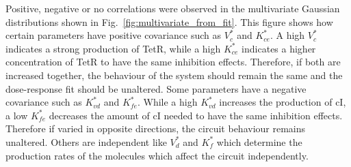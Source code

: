 Positive, negative or no correlations were observed in the multivariate Gaussian distributions shown in Fig.~\ref{fig:multivariate_from_fit}.
This figure shows how certain parameters have positive covariance such as $V^*_c$ and $K^*_{ce}$.
A high $V^*_c$ indicates a strong production of TetR, while a high $K^*_{ce}$ indicates a higher concentration of TetR to have the same inhibition effects.
Therefore, if both are increased together, the behaviour of the system should remain the same and the dose-response fit should be unaltered.
Some parameters have a negative covariance such as $K^*_{vd}$ and $K^*_{fe}$.
While a high $K^*_{vd}$ increases the production of cI, a low $K^*_{fe}$ decreases the amount of cI needed to have the same inhibition effects.
Therefore if varied in opposite directions, the circuit behaviour remains unaltered.
Others are independent like $V^*_{d}$ and $K^*_{f}$ which determine the production rates of the molecules which affect the circuit independently.

